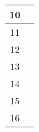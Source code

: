 \begin{center}
\begin{longtable}{|c|p{12cm}|}
10 & 
\begin{journal}
	\item 
\end{journal}
\\ \hline
11 & 
\begin{journal}
	\item 
\end{journal}
\\ \hline
12 & 
\begin{journal}
	\item 
\end{journal}
\\ \hline
13 & 
\begin{journal}
	\item 
\end{journal}
\\ \hline
14 & 
\begin{journal}
	\item 
\end{journal}
\\ \hline
15 & 
\begin{journal}
	\item 
\end{journal}
\\ \hline
16 & 
\begin{journal}
	\item 
\end{journal}
\\ \hline
\end{longtable}
\end{center}

